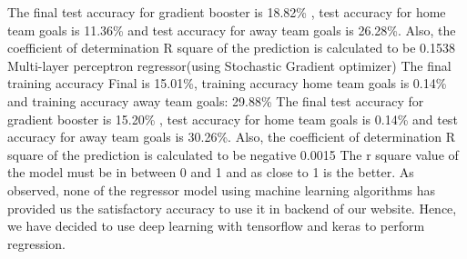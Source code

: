 The final test accuracy for gradient booster is 18.82\% , test accuracy for home team goals is 11.36\% and test accuracy for away team goals is 26.28\%. Also, the coefficient of determination R square of the prediction is calculated to be 0.1538 \newline
Multi-layer perceptron regressor(using Stochastic Gradient optimizer)\newline
The final training accuracy Final is 15.01\%, training accuracy home team goals is 0.14\% and training accuracy away team goals: 29.88\% \newline
The final test accuracy for gradient booster is 15.20\% , test accuracy for home team goals is 0.14\% and test accuracy for away team goals is 30.26\%. Also, the coefficient of determination R square of the prediction is calculated to be negative 0.0015 \newline 
The r square value of the model must be in between 0 and 1 and as close to 1 is the better.\newline
As observed, none of the regressor model using machine learning algorithms has provided us the satisfactory accuracy to use it in backend of our website. Hence, we have decided to use deep learning with tensorflow and keras to perform regression.\newline
